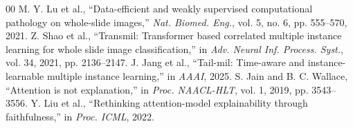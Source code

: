 \documentclass[conference]{IEEEtran}
\begin{document}
\begin{thebibliography}{00}
 M. Y. Lu et al., ``Data-efficient and weakly supervised computational pathology on whole-slide images,'' \emph{Nat. Biomed. Eng.}, vol. 5, no. 6, pp. 555--570, 2021.
 Z. Shao et al., ``Transmil: Transformer based correlated multiple instance learning for whole slide image classification,'' in \emph{Adv. Neural Inf. Process. Syst.}, vol. 34, 2021, pp. 2136--2147.
 J. Jang et al., ``Tail-mil: Time-aware and instance-learnable multiple instance learning,'' in \emph{AAAI}, 2025.
 S. Jain and B. C. Wallace, ``Attention is not explanation,'' in \emph{Proc. NAACL-HLT}, vol. 1, 2019, pp. 3543--3556.
 Y. Liu et al., ``Rethinking attention-model explainability through faithfulness,'' in \emph{Proc. ICML}, 2022.
\end{thebibliography}
\end{document}
